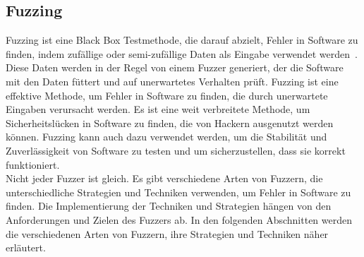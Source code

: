 
\subsection{Fuzzing}\label{subsec:fuzzing}
Fuzzing ist eine Black Box Testmethode, die darauf abzielt, Fehler in Software zu finden, indem zufällige oder
semi-zufällige Daten als Eingabe verwendet werden~\cite{fuzzing}.
Diese Daten werden in der Regel von einem Fuzzer generiert, der die Software mit den Daten füttert und auf unerwartetes Verhalten prüft.
Fuzzing ist eine effektive Methode, um Fehler in Software zu finden, die durch unerwartete Eingaben verursacht werden.
Es ist eine weit verbreitete Methode, um Sicherheitslücken in Software zu finden, die von Hackern ausgenutzt werden können.
Fuzzing kann auch dazu verwendet werden, um die Stabilität und Zuverlässigkeit von Software zu testen und um sicherzustellen,
dass sie korrekt funktioniert. \\
Nicht jeder Fuzzer ist gleich.
Es gibt verschiedene Arten von Fuzzern, die unterschiedliche Strategien und Techniken verwenden, um Fehler in Software zu finden.
Die Implementierung der Techniken und Strategien hängen von den Anforderungen und Zielen des Fuzzers ab.
In den folgenden Abschnitten werden die verschiedenen Arten von Fuzzern, ihre Strategien und Techniken näher erläutert.




